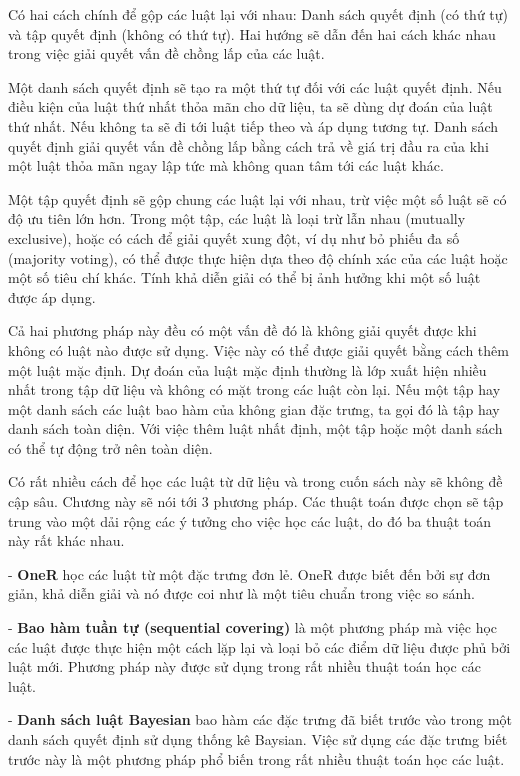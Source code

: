 Có hai cách chính để gộp các luật lại với nhau: Danh sách quyết định (có thứ tự) và tập quyết định (không có thứ tự). Hai hướng sẽ dẫn đến hai cách khác nhau trong việc giải quyết vấn đề chồng lấp của các luật.

Một danh sách quyết định sẽ tạo ra một thứ tự đối với các luật quyết định. Nếu điều kiện của luật thứ nhất thỏa mãn cho dữ liệu, ta sẽ dùng dự đoán của luật thứ nhất. Nếu không ta sẽ đi tới luật tiếp theo và áp dụng tương tự. Danh sách quyết định giải quyết vấn đề chồng lấp bằng cách trả về giá trị đầu ra của khi một luật thỏa mãn ngay lập tức mà không quan tâm tới các luật khác.

Một tập quyết định sẽ gộp chung các luật lại với nhau, trừ việc một số luật sẽ có độ ưu tiên lớn hơn. Trong một tập, các luật là loại trừ lẫn nhau (mutually exclusive), hoặc có cách để giải quyết xung đột, ví dụ như bỏ phiếu đa số (majority voting), có thể được thực hiện dựa theo độ chính xác của các luật hoặc một số tiêu chí khác. Tính khả diễn giải có thể bị ảnh hưởng khi một số luật được áp dụng.

Cả hai phương pháp này đều có một vấn đề đó là không giải quyết được khi không có luật nào được sử dụng. Việc này có thể được giải quyết bằng cách thêm một luật mặc định. Dự đoán của luật mặc định thường là lớp xuất hiện nhiều nhất trong tập dữ liệu và không có mặt trong các luật còn lại. Nếu một tập hay một danh sách các luật bao hàm của không gian đặc trưng, ta gọi đó là  tập hay danh sách toàn diện. Với việc thêm luật nhất định, một tập hoặc một danh sách có thể tự động trở nên toàn diện.

Có rất nhiều cách để học các luật từ dữ liệu và trong cuốn sách này sẽ không đề cập sâu. Chương này sẽ nói tới 3 phương pháp. Các thuật toán được chọn sẽ tập trung vào một dải rộng các ý tưởng cho việc học các luật, do đó ba thuật toán này rất khác nhau.

- \textbf{OneR} học các luật từ một đặc trưng đơn lẻ. OneR được biết đến bởi sự đơn giản, khả diễn giải và nó được coi như là một tiêu chuẩn trong việc so sánh.

- \textbf{Bao hàm tuần tự (sequential covering)} là một phương pháp mà việc học các luật được thực hiện một cách lặp lại và loại bỏ các điểm dữ liệu được phủ bởi luật mới. Phương pháp này được sử dụng trong rất nhiều thuật toán học các luật.

- \textbf{Danh sách luật Bayesian} bao hàm các đặc trưng đã biết trước vào trong một danh sách quyết định sử dụng thống kê Baysian. Việc sử dụng các đặc trưng biết trước này là một phương pháp phổ biến trong rất nhiều thuật toán học các luật.

